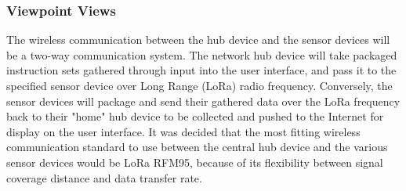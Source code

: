 \documentclass[onecolumn, draftclsnofoot,10pt, compsoc]{IEEEtran}
\newcounter{subsubsubsection}[subsubsection]
\begin{document}
	\subsubsection{Viewpoint Views}
	The wireless communication between the hub device and the sensor devices will be a two-way communication system.
	The network hub device will take packaged instruction sets gathered through input into the user interface, and pass it to the specified sensor device over Long Range (LoRa) radio frequency.
	Conversely, the sensor devices will package and send their gathered data over the LoRa frequency back to their "home" hub device to be collected and pushed to the Internet for display on the user interface.
	It was decided that the most fitting wireless communication standard to use between the central hub device and the various sensor devices would be LoRa RFM95, because of its flexibility between signal coverage distance and data transfer rate.
	
\end{document}
